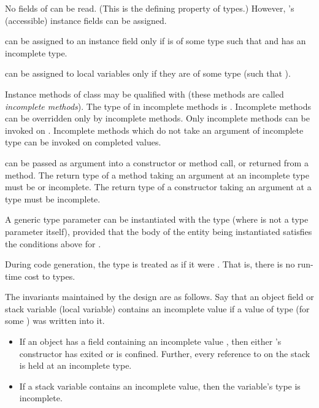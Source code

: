 No fields of  can be read.  (This is the defining property of
 types.)  However, 's (accessible) instance fields
can be assigned.

 can be assigned to an instance field  only if 
is of some type  such that  and  has an
incomplete type.

 can be assigned to local variables  only if they are of some type
 (such that ).

Instance methods of class  may be qualified with 
(these methods are called {\em incomplete methods}). The type of 
in incomplete methods is . Incomplete methods can be
overridden only by incomplete methods.  Only incomplete methods can be
invoked on . Incomplete methods which do not take an argument of incomplete
type can be invoked on completed values. 


 can be passed as argument into a constructor or method call,
or returned from a method.  The return type of a method taking an
argument at an incomplete type must be  or incomplete.  The
return type of a constructor taking an argument at a  type
must be incomplete.
 
A generic type parameter  can be instantiated with the type  (where  is not a type parameter itself), provided that the body of
the entity being instantiated satisfies the conditions above for .

During code generation, the type  is treated as if it were
. That is, there is no run-time cost to  types.

The invariants maintained by the design are as follows.  Say that an
object field or stack variable (local variable) contains an incomplete
value if a value of type  (for some ) was written
into it.

\begin{itemize}
\item If an object  has a field containing an incomplete value ,
then either 's constructor has exited or  is confined.
Further, every reference to  on the stack is held at an incomplete type.

\item If a stack variable contains an incomplete value, then
  the variable's type is incomplete.

\end{itemize}


